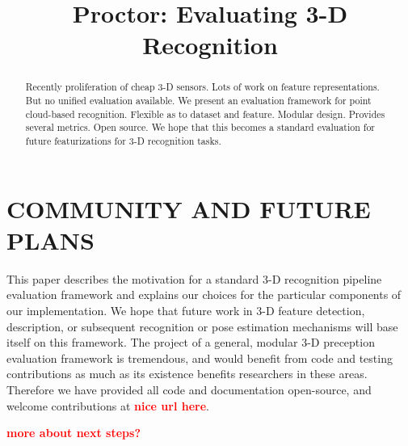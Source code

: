 \documentclass[a4paper, 10pt, conference]{ieeeconf}      %
\title{\LARGE \bf
Proctor: Evaluating 3-D Recognition
}
\newcommand{\note}[1]{\textcolor{red}{\textbf{#1}}}
\begin{document}
\maketitle
\thispagestyle{empty}
\pagestyle{empty}

\begin{abstract}

Recently proliferation of cheap 3-D sensors.
Lots of work on feature representations.
But no unified evaluation available.
We present an evaluation framework for point cloud-based recognition.
Flexible as to dataset and feature.
Modular design.
Provides several metrics.
Open source.
We hope that this becomes a standard evaluation for future featurizations for 3-D recognition tasks.

\end{abstract}







\section{COMMUNITY AND FUTURE PLANS}

This paper describes the motivation for a standard 3-D recognition pipeline evaluation framework and explains our choices for the particular components of our implementation.
We hope that future work in 3-D feature detection, description, or subsequent recognition or pose estimation mechanisms will base itself on this framework.
The project of a general, modular 3-D preception evaluation framework is tremendous, and would benefit from code and testing contributions as much as its existence benefits researchers in these areas.
Therefore we have provided all code and documentation open-source, and welcome contributions at \note{nice url here}.

\note{more about next steps?}

% 

{\small


}
\end{document}
